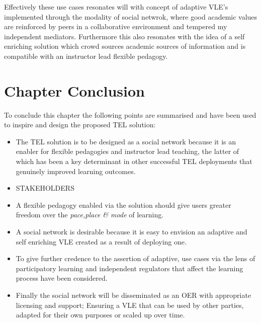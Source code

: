 \begin{itemize}[\null]
\begin{itemize}
        Effectively these use cases resonates will with concept of adaptive VLE's implemented through the modality of social netwrok, where good academic values are reinforced by peers in a collaborative environment and tempered my independent mediators. Furthermore this also resonates with the idea of a self enriching solution which crowd sources academic sources of information and is compatible with an instructor lead flexible pedagogy.
    \end{itemize}
    

    
    \end{itemize}
    
\section{Chapter Conclusion}

To conclude this chapter the following points are summarised and have been used to inspire and design the proposed TEL solution:

\begin{itemize}
    \item The TEL solution is to be designed as a social network because it is an enabler for flexible pedagogies and instructor lead teaching, the latter of which has been a key determinant in other successful TEL deployments that genuinely improved learning outcomes.
    \item STAKEHOLDERS
    \item A flexible pedagogy enabled via the solution should give users greater freedom over the \textit{pace,place \& mode} of learning.
    \item A social network is desirable because it is easy to envision an adaptive and self enriching VLE created as a result of deploying one.
    \item To give further credence to the assertion of adaptive, use cases via the lens of participatory learning and independent regulators that affect the learning process have been considered.
    \item Finally the social network will be disseminated as an OER with appropriate licensing and support; Ensuring a VLE that can be used by other parties, adapted for their own purposes or scaled up over time.
\end{itemize}

    
    
    
    